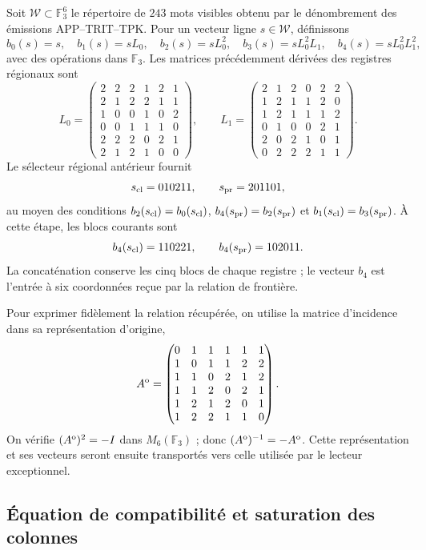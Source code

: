 Soit $\mathcal W\subset\mathbb F_3^6$ le répertoire de $243$ mots visibles obtenu par le dénombrement des émissions APP--TRIT--TPK. Pour un vecteur ligne $s\in\mathcal W$, définissons
\[
 b_0(s)=s,\quad b_1(s)=sL_0,\quad b_2(s)=sL_0^2,\quad
 b_3(s)=sL_0^2L_1,\quad b_4(s)=sL_0^2L_1^2,
\]
avec des opérations dans $\mathbb F_3$. Les matrices précédemment dérivées des registres régionaux sont
\[
L_0=\begin{pmatrix}
2&2&2&1&2&1\\2&1&2&2&1&1\\1&0&0&1&0&2\\
0&0&1&1&1&0\\2&2&2&0&2&1\\2&1&2&1&0&0
\end{pmatrix},\qquad
L_1=\begin{pmatrix}
2&1&2&0&2&2\\1&2&1&1&2&0\\1&2&1&1&1&2\\
0&1&0&0&2&1\\2&0&2&1&0&1\\0&2&2&2&1&1
\end{pmatrix}.
\]
Le sélecteur régional antérieur fournit
\[
s_{\rm cl}=010211,\qquad s_{\rm pr}=201101,
\]
au moyen des conditions $b_2(s_{\rm cl})=b_0(s_{\rm cl})$, $b_4(s_{\rm pr})=b_2(s_{\rm pr})$ et $b_1(s_{\rm cl})=b_3(s_{\rm pr})$. À cette étape, les blocs courants sont
\[
b_4(s_{\rm cl})=110221,\qquad
b_4(s_{\rm pr})=102011.
\]
La concaténation conserve les cinq blocs de chaque registre ; le vecteur $b_4$ est l’entrée à six coordonnées reçue par la relation de frontière.

Pour exprimer fidèlement la relation récupérée, on utilise la matrice d’incidence dans sa représentation d’origine,
\begin{equation}
A^{\rm o}=\begin{pmatrix}
0&1&1&1&1&1\\1&0&1&1&2&2\\1&1&0&2&1&2\\
1&1&2&0&2&1\\1&2&1&2&0&1\\1&2&2&1&1&0
\end{pmatrix}.
\label{r36c:eq:ao}
\end{equation}
On vérifie $(A^{\rm o})^2=-I$ dans $M_6(\mathbb F_3)$ ; donc $(A^{\rm o})^{-1}=-A^{\rm o}$. Cette représentation et ses vecteurs seront ensuite transportés vers celle utilisée par le lecteur exceptionnel.

\subsection{Équation de compatibilité et saturation des colonnes}


